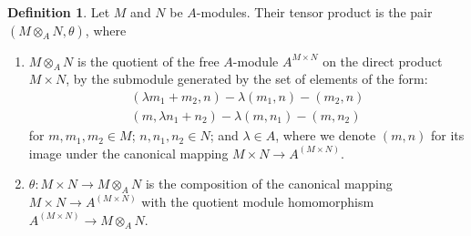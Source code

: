 \documentclass[a4paper]{book}
\theoremstyle{definition}
\newtheorem{definition}{Definition}[]
\begin{document}
\begin{defbox}
    \begin{definition}
        Let \(M\) and \(N\) be \(A\)-modules. Their tensor product is the pair \((M \otimes_A N, \theta)\), where
        \begin{enumerate}
            \item \(M \otimes_A N\) is the quotient of the free \(A\)-module \(A^{M \times N}\) on the direct product \(M \times N\), by the submodule generated by the set of elements of the form:
            \begin{align*}
                (\lambda m_1 + m_2, n) - \lambda (m_1, n) - (m_2, n) \\
                (m, \lambda n_1 + n_2) - \lambda (m, n_1) - (m, n_2)
            \end{align*}
            for \(m, m_1, m_2 \in M\); \(n, n_1, n_2 \in N\); and \(\lambda \in A\), where we denote \((m, n)\) for its image under the canonical mapping \(M \times N \rightarrow A^{(M \times N)}\).
            \item \(\theta: M \times N \rightarrow M \otimes_A N\) is the composition of the canonical mapping \(M \times N \rightarrow A^{(M \times N)}\) with the quotient module homomorphism \(A^{(M \times N)} \rightarrow M \otimes_A N\).
        \end{enumerate}
    \end{definition}
\end{defbox}
\end{document}

